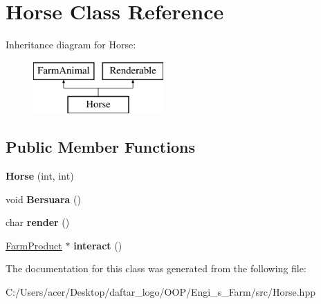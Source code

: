 \hypertarget{class_horse}{}\section{Horse Class Reference}
\label{class_horse}
Inheritance diagram for Horse\+:\begin{figure}[H]
\begin{center}
\leavevmode
\includegraphics[height=2.000000cm]{class_horse}
\end{center}
\end{figure}
\subsection*{Public Member Functions}
\begin{DoxyCompactItemize}
\item 
\mbox{\label{class_horse_a76077cef5c4696a4ba1d0b94f86d8955}} 
{\bfseries Horse} (int, int)
\item 
\mbox{\label{class_horse_a259b1851e05aa95c0bfd4715ede691c6}} 
void {\bfseries Bersuara} ()
\item 
\mbox{\label{class_horse_a40abd65ce7f30c72bd420267149543d3}} 
char {\bfseries render} ()
\item 
\mbox{\label{class_horse_acb8e550a9b3a5fac438fc4d3d6cb3313}} 
\mbox{\hyperlink{class_farm_product}{Farm\+Product}} $\ast$ {\bfseries interact} ()
\end{DoxyCompactItemize}


The documentation for this class was generated from the following file\+:\begin{DoxyCompactItemize}
\item 
C\+:/\+Users/acer/\+Desktop/daftar\+\_\+logo/\+O\+O\+P/\+Engi\+\_\+s\+\_\+\+Farm/src/Horse.\+hpp\end{DoxyCompactItemize}
